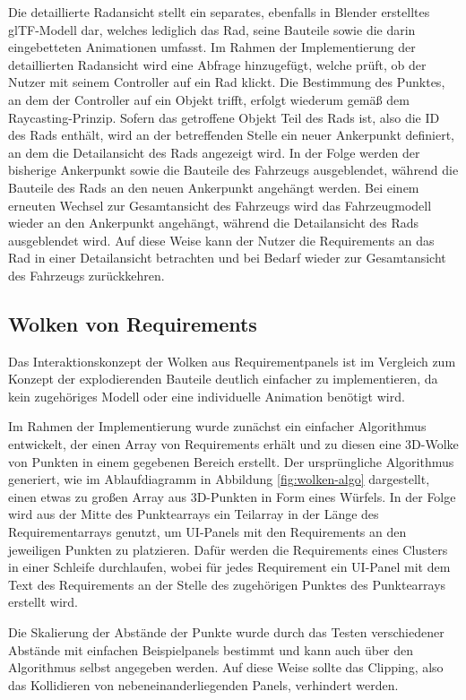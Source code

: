 Die detaillierte Radansicht stellt ein separates, ebenfalls in Blender erstelltes glTF-Modell dar, welches lediglich das Rad, seine Bauteile sowie die darin eingebetteten Animationen umfasst.
Im Rahmen der Implementierung der detaillierten Radansicht wird eine Abfrage hinzugefügt, welche prüft, ob der Nutzer mit seinem Controller auf ein Rad klickt.
Die Bestimmung des Punktes, an dem der Controller auf ein Objekt trifft, erfolgt wiederum gemäß dem Raycasting-Prinzip.
Sofern das getroffene Objekt Teil des Rads ist, also die ID des Rads enthält, wird an der betreffenden Stelle ein neuer Ankerpunkt definiert, an dem die Detailansicht des Rads angezeigt wird.
In der Folge werden der bisherige Ankerpunkt sowie die Bauteile des Fahrzeugs ausgeblendet, während die Bauteile des Rads an den neuen Ankerpunkt angehängt werden.
Bei einem erneuten Wechsel zur Gesamtansicht des Fahrzeugs wird das Fahrzeugmodell wieder an den Ankerpunkt angehängt, während die Detailansicht des Rads ausgeblendet wird.
Auf diese Weise kann der Nutzer die Requirements an das Rad in einer Detailansicht betrachten und bei Bedarf wieder zur Gesamtansicht des Fahrzeugs zurückkehren.

\subsection{Wolken von Requirements}

Das Interaktionskonzept der Wolken aus Requirementpanels ist im Vergleich zum Konzept der explodierenden Bauteile deutlich einfacher zu implementieren, da kein zugehöriges Modell oder eine individuelle Animation benötigt wird.

Im Rahmen der Implementierung wurde zunächst ein einfacher Algorithmus entwickelt, der einen Array von Requirements erhält und zu diesen eine 3D-Wolke von Punkten in einem gegebenen Bereich erstellt.
Der ursprüngliche Algorithmus generiert, wie im Ablaufdiagramm in Abbildung \ref{fig:wolken-algo} dargestellt, einen etwas zu großen Array aus 3D-Punkten in Form eines Würfels.
In der Folge wird aus der Mitte des Punktearrays ein Teilarray in der Länge des Requirementarrays genutzt, um UI-Panels mit den Requirements an den jeweiligen Punkten zu platzieren.
Dafür werden die Requirements eines Clusters in einer Schleife durchlaufen, wobei für jedes Requirement ein UI-Panel mit dem Text des Requirements an der Stelle des zugehörigen Punktes des Punktearrays erstellt wird.

Die Skalierung der Abstände der Punkte wurde durch das Testen verschiedener Abstände mit einfachen Beispielpanels bestimmt und kann auch über den Algorithmus selbst angegeben werden.
Auf diese Weise sollte das Clipping, also das Kollidieren von nebeneinanderliegenden Panels, verhindert werden.

